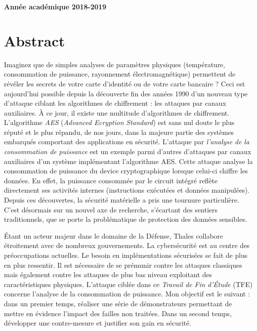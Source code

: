 \documentclass[oneside]{book}
\begin{document}
\vfill 
\centerline{\textbf{Année académique 2018-2019}}

\newpage
\strut
\thispagestyle{empty}
\newpage
\fancyfoot[C]{\thepage}

{} %
\null\vfil
\section*{\centering Abstract}

Imaginez que de simples analyses de paramètres physiques (température, consommation de puissance, rayonnement électromagnétique) permettent de révéler les secrets de votre carte d'identité ou de votre carte bancaire ?  
Ceci est aujourd'hui possible depuis la découverte fin des années 1990 d'un nouveau type d'attaque ciblant les algorithmes de chiffrement : les attaques par canaux auxiliaires. À ce jour, il existe une multitude d’algorithmes de chiffrement. L’algorithme \textit{AES} (\textit{Advanced Ecryption Standard}) est sans nul doute le plus réputé et le plus répandu, de nos jours, dans la majeure partie des systèmes embarqués comportant des applications en sécurité. L'attaque par \textit{l'analyse de la consommation de puissance} est un exemple parmi d'autres d'attaques par canaux auxiliaires d'un système implémentant l'algorithme AES. Cette attaque analyse la consommation de puissance du device cryptographique lorsque celui-ci chiffre les données. En effet, la puissance consommée par le circuit intégré reflète directement ses activités internes (instructions exécutées et données manipulées). Depuis ces découvertes, la sécurité matérielle a pris une tournure particulière. C’est désormais sur un nouvel axe de recherche, s’écartant des sentiers traditionnels, que se porte la problématique de protection des données sensibles.

Étant un acteur majeur dans le domaine de la Défense, Thales collabore étroitement avec de nombreux gouvernements. La cybersécurité est au centre des préoccupations actuelles. Le besoin en implémentations sécurisées se fait de plus en plus ressentir. Il est nécessaire de se prémunir contre les attaques classiques mais également contre les attaques de plus bas niveau exploitant des caractéristiques physiques. L'attaque ciblée dans ce \textit{Travail de Fin d'Étude} (TFE) concerne l'analyse de la consommation de puissance. Mon objectif est le suivant : dans un premier temps, réaliser une série de démonstrateurs permettant de mettre en évidence l'impact des failles non traitées. Dans un second temps, développer une contre-mesure et justifier son gain en sécurité.
\end{document}
